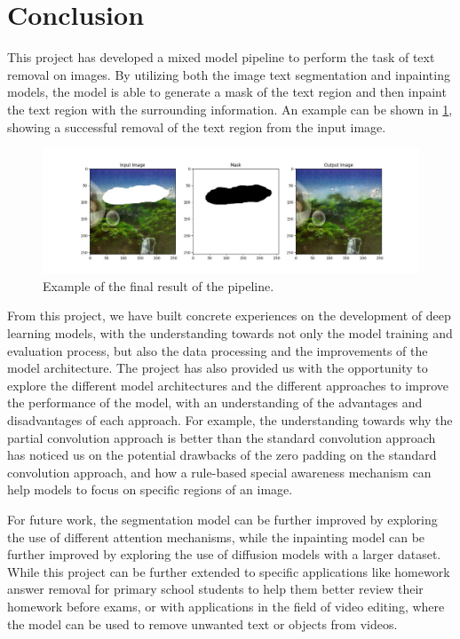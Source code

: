 \documentclass[10pt,twocolumn,letterpaper]{article}
\begin{document}
\section{Conclusion}

This project has developed a mixed model pipeline to perform the task of text removal on images. By utilizing both the image text segmentation and inpainting models,
the model is able to generate a mask of the text region and then inpaint the text region with the surrounding information. An example can be shown in \cref{fig:final_result},
showing a successful removal of the text region from the input image.

\begin{figure}[t]
    \centering
    \includegraphics[width=\linewidth]{figures/milestone/final_result.jpg}
    \caption{Example of the final result of the pipeline.}
    \label{fig:final_result}
\end{figure}

From this project, we have built concrete experiences on the development of deep learning models, with the understanding towards not only the model training and evaluation process, but also the 
data processing and the improvements of the model architecture. The project has also provided us with the opportunity to explore the different model architectures and the different approaches to 
improve the performance of the model, with an understanding of the advantages and disadvantages of each approach. For example, the understanding towards why the partial convolution approach is
better than the standard convolution approach has noticed us on the potential drawbacks of the zero padding on the standard convolution approach, and how a rule-based special awareness mechanism can help
models to focus on specific regions of an image.

For future work, the segmentation model can be further improved by exploring the use of different attention mechanisms, while the inpainting model can be further improved by exploring the use of 
diffusion models with a larger dataset. While this project can be further extended to specific applications like homework answer removal for primary school students to help them better review their homework
before exams, or with applications in the field of video editing, where the model can be used to remove unwanted text or objects from videos.
\end{document}
